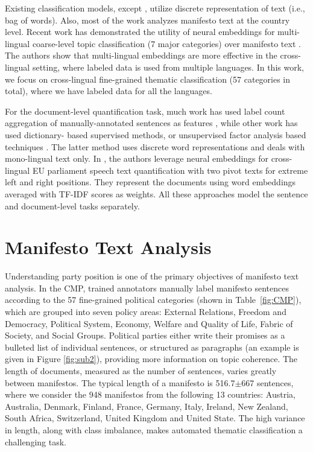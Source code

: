 \documentclass[11pt,a4paper]{article}
\newcommand{\tabref}[2][]{Table#1~\ref{#2}\xspace}
\begin{document}
Existing classification models, except \cite{W17-2906}, utilize discrete representation of text (i.e., bag of words).  Also, most of the work analyzes manifesto text at the country level. Recent work has demonstrated the utility of neural embeddings for multi-lingual coarse-level topic classification (7 major categories) over manifesto text \cite{W17-2906}. The authors show that multi-lingual embeddings are more effective in the cross-lingual setting, where labeled data is used from multiple languages. In this work, we focus on cross-lingual fine-grained thematic classification (57 categories in total), where we have labeled data for all the languages.

For the document-level quantification task, much work has used label count aggregation of  manually-annotated sentences as features \cite{lowe2011scaling, benoit2014putting}, while other work has used dictionary- based supervised methods, or unsupervised factor analysis based techniques \cite{hjorth2015computers, 2017arXiv170704737B}. The latter method uses discrete word representations and deals with mono-lingual text only. In , the authors leverage neural embeddings for cross-lingual EU parliament speech text quantification with two pivot texts for extreme left and right positions. They represent the documents using word embeddings averaged with TF-IDF scores as weights. All these approaches model the sentence and document-level tasks separately.


\section{Manifesto Text Analysis}
Understanding party position is one of the primary objectives of manifesto text analysis. In the CMP, trained annotators manually label manifesto sentences according to the 57 fine-grained political categories (shown in \tabref{fig:CMP}), which are grouped into seven policy areas: External Relations, Freedom and Democracy, Political System, Economy, Welfare and Quality of Life, Fabric of Society, and Social Groups. Political parties either write their promises as a bulleted list of individual sentences, or structured as paragraphs (an example is given in Figure \ref{fig:sub2}), providing more information on topic coherence. The length of documents, measured as the number of sentences, varies greatly between manifestos. The typical length of a manifesto is 516.7$\pm$667 sentences, where we consider the 948 manifestos from the following 13 countries: Austria, Australia, Denmark, Finland, France, Germany, Italy, Ireland, New Zealand, South Africa, Switzerland, United Kingdom and United State. The high variance in length, along with class imbalance, makes automated thematic classification a challenging task.  
\end{document}
